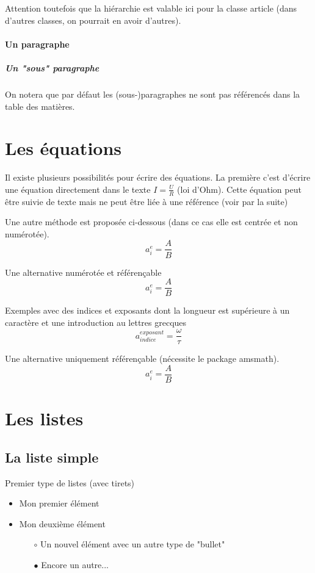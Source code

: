 \documentclass[a4paper,11pt]{article}
\begin{document}
Attention toutefois que la hiérarchie est valable ici pour la classe article (dans d'autres classes, on pourrait en avoir d'autres).

\paragraph{Un paragraphe}

\subparagraph{Un "sous" paragraphe}
On notera que par défaut les (sous-)paragraphes ne sont pas référencés dans la table des matières.

\blindtext

\newpage
\section{Les équations}

Il existe plusieurs possibilités pour écrire des équations. La première c'est d'écrire une équation directement dans le texte $I = \frac{U}{R}$ (loi d'Ohm). Cette équation peut être suivie de texte mais ne peut être liée à une référence (voir par la suite)

Une autre méthode est proposée ci-dessous (dans ce cas elle est centrée et non numérotée).
$$a_i^e = \frac{A}{B}$$

Une alternative numérotée et référençable
\begin{equation}
a_i^e = \frac{A}{B}
\end{equation}

Exemples avec des indices et exposants dont la longueur est supérieure à un caractère et une introduction au lettres grecques
\begin{equation}
a_{indice}^{exposant} = \frac{\omega}{\tau}
\end{equation}

Une alternative uniquement référençable (nécessite le package amsmath).
\begin{equation*}
a_i^e = \frac{A}{B}
\end{equation*}

\newpage
\section{Les listes}
\subsection{La liste simple}
Premier type de listes (avec tirets)
\begin{itemize}
	\item Mon premier élément
	\item Mon deuxième élément
	\begin{itemize}
		\item [$\circ$] Un nouvel élément avec un autre type de "bullet"
		\item [$\bullet$] Encore un autre...
	\end{itemize}
\end{itemize}
\end{document}
